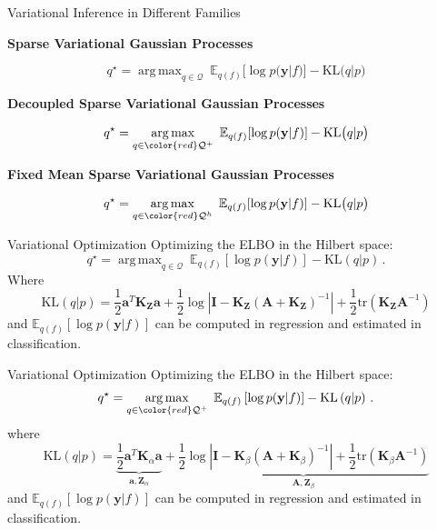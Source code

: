 \documentclass[aspectratio=149]{beamer}
\DeclareMathOperator*{\argmax}{arg\,max}
\begin{document}
    \begin{frame}{Variational Inference in Different Families}
        \begin{center}
            \textbf{Sparse Variational Gaussian Processes}
        \end{center}
        \[
        q^\star = \argmax_{q \in \mathcal{Q}}\  \mathbb{E}_{q(f)}[ \log p(\mathbf{y} | f)] - \text{KL}\big(q|p\big)
        \]   
        \pause
        \begin{center}
            \textbf{Decoupled Sparse Variational Gaussian Processes}
        \end{center}
        \[
        q^\star = \argmax_{q \in {\color{red}\mathcal{Q}^+}}\ \mathbb{E}_{q(f)}[ \log p(\mathbf{y} | f)] - \text{KL}\big(q|p\big)
        \]   
        \pause
        \begin{center}
            \textbf{Fixed Mean Sparse Variational Gaussian Processes}
        \end{center}
        \[
        q^\star = \argmax_{q \in {\color{red}\mathcal{Q}^h}}\  \mathbb{E}_{q(f)}[ \log p(\mathbf{y} | f)] - \text{KL}\big(q|p\big)
        \]   
    \end{frame}

    \begin{frame}{Variational Optimization}
        Optimizing the ELBO in the Hilbert space:
        \[
        q^\star = \argmax_{q \in \mathcal{Q}}\ \mathbb{E}_{q(f)} \left[ \log p(\mathbf{y}|f)\right] - \text{KL}\left(q|p\right)\,.
        \]
        Where
        \[
            \text{KL}\left(q | p\right) = \frac{1}{2} \bm{a}^T \bm{K}_{\bm Z} \bm{a} +  \frac{1}{2} \log |\bm{I} - \bm{K}_{\bm{Z}} (\bm{A} + \bm{K}_{\bm{Z}})^{-1}| + \frac{1}{2} \text{tr}\left( \bm{K}_{\bm{Z}}\bm{A}^{-1} \right)
        \]
        and \(\mathbb{E}_{q(f)}\left[ \log p(\mathbf{y}|f)\right] \) can be computed in regression and estimated in classification.
    \end{frame}
    
    \begin{frame}{Variational Optimization}
        Optimizing the ELBO in the Hilbert space:
        \[
        q^\star = \argmax_{q \in {\color{red}\mathcal{Q}^+}}\ \mathbb{E}_{q(f)} \left[ \log p(\mathbf{y}|f)\right] - \text{KL}\left(q|p\right)\,.
        \]
        where
        \[
            \text{KL}\left(q | p\right) = \underbrace{\frac{1}{2} \bm{a}^T \bm{K}_{\alpha} \bm{a}}_{\bm{a}, \mathbf{Z}_\alpha} +  \underbrace{\frac{1}{2} \log |\bm{I} - \bm{K}_{\beta} (\bm{A} + \bm{K}_{\beta})^{-1}| + \frac{1}{2} \text{tr}\left( \bm{K}_\beta\bm{A}^{-1} \right)}_{\bm{A}, \mathbf{Z}_\beta}
        \]
        and \(\mathbb{E}_{q(f)}\left[ \log p(\mathbf{y}|f)\right] \) can be computed in regression and estimated in classification.
    \end{frame}
\end{document}
